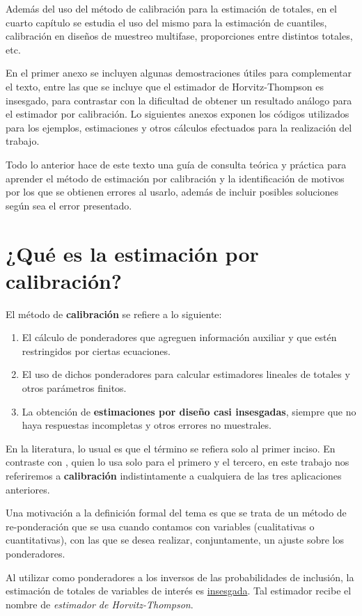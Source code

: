 \documentclass[a4paper,twoside,openright,12pt]{book}
\theoremstyle{definition}
\numberwithin{equation}{chapter}
\numberwithin{figure}{chapter}
\numberwithin{table}{chapter}
\numberwithin{theorem}{chapter}
\numberwithin{lemma}{chapter}
\begin{document}
Además del uso del método de calibración para la estimación de totales, en el cuarto capítulo se estudia el uso del mismo para la estimación de cuantiles, calibración en diseños de muestreo multifase, proporciones entre distintos totales, etc.

En el primer anexo se incluyen algunas demostraciones útiles para complementar el texto,  entre las que se incluye que el estimador de Horvitz-Thompson es insesgado, para contrastar con la dificultad de obtener un resultado análogo para el estimador por calibración. Lo siguientes anexos exponen los códigos utilizados para los ejemplos, estimaciones y otros cálculos efectuados para la realización del trabajo.

Todo lo anterior hace de este texto una guía de consulta teórica y práctica para aprender el método de estimación por calibración y la identificación de motivos por los que se obtienen errores al usarlo, además de incluir posibles soluciones según sea el error presentado.
\chapter{¿Qué es la estimación por calibración?}
El método de \textbf{calibración} se refiere a lo siguiente:%
\begin{enumerate}
	\item El cálculo de ponderadores que agreguen información auxiliar y que estén restringidos por ciertas ecuaciones.
	\item El uso de dichos ponderadores para calcular estimadores lineales de totales y otros parámetros finitos.
	\item La obtención de \textbf{estimaciones por diseño casi insesgadas}, siempre que no haya respuestas incompletas y otros errores no muestrales.
\end{enumerate}
En la literatura, lo usual es que el término se refiera solo al primer inciso. En contraste con \cite{CIS-220496}, quien lo usa solo para el primero y el tercero, en este trabajo nos referiremos a \textbf{calibración} indistintamente a cualquiera de las tres aplicaciones anteriores.%

Una motivación a la definición formal del tema es que se trata de un método de re-ponderación que se usa cuando contamos con variables (cualitativas o cuantitativas), con las que se desea realizar, conjuntamente, un ajuste sobre los ponderadores.

Al utilizar como ponderadores a los inversos de las probabilidades de inclusión, la estimación de totales de variables de interés es \hyperlink{insesgada}{insesgada}. Tal estimador recibe el nombre de \textsl{estimador de Horvitz-Thompson}.
\end{document}
